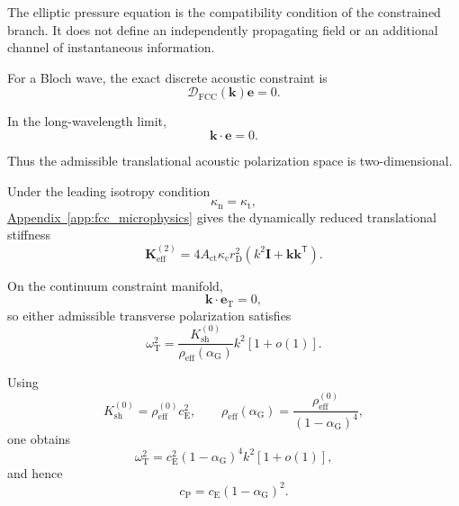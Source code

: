 The elliptic pressure equation is the compatibility condition of the constrained branch. It does not define an independently propagating field or an additional channel of instantaneous information.

For a Bloch wave, the exact discrete acoustic constraint is
\begin{equation}
    \mathcal{D}_{\mathrm{FCC}}(\mathbf{k})
    \mathbf{e}
    =
    0.
\end{equation}

In the long-wavelength limit,
\begin{equation}
    \mathbf{k}\cdot\mathbf{e}
    =
    0.
\end{equation}

Thus the admissible translational acoustic polarization space is two-dimensional.

Under the leading isotropy condition
\begin{equation}
    \kappa_{\mathrm{n}}
    =
    \kappa_{\mathrm{t}},
\end{equation}
\hyperref[app:fcc_microphysics]{Appendix~\ref*{app:fcc_microphysics}} gives the dynamically reduced translational stiffness
\begin{equation}
    \mathbf{K}_{\mathrm{eff}}^{(2)}
    =
    4A_{\mathrm{ct}}
    \kappa_{\mathrm{c}}
    r_{\mathrm{D}}^2
    \left(
        k^2\mathbf{I}
        +
        \mathbf{k}\mathbf{k}^{\mathsf{T}}
    \right).
\end{equation}

On the continuum constraint manifold,
\begin{equation}
    \mathbf{k}\cdot\mathbf{e}_{\mathrm{T}}
    =
    0,
\end{equation}
so either admissible transverse polarization satisfies
\begin{equation}
    \omega_{\mathrm{T}}^2
    =
    \frac{
        K_{\mathrm{sh}}^{(0)}
    }{
        \rho_{\mathrm{eff}}(\alpha_{\mathrm{G}})
    }
    k^2
    \left[
        1+o(1)
    \right].
\end{equation}

Using
\begin{equation}
    K_{\mathrm{sh}}^{(0)}
    =
    \rho_{\mathrm{eff}}^{(0)}
    c_{\mathrm{E}}^2,
    \qquad
    \rho_{\mathrm{eff}}(\alpha_{\mathrm{G}})
    =
    \frac{
        \rho_{\mathrm{eff}}^{(0)}
    }{
        (1-\alpha_{\mathrm{G}})^4
    },
\end{equation}
one obtains
\begin{equation}
    \omega_{\mathrm{T}}^2
    =
    c_{\mathrm{E}}^2
    (1-\alpha_{\mathrm{G}})^4
    k^2
    \left[
        1+o(1)
    \right],
\end{equation}
and hence
\begin{equation}
    c_{\mathrm{P}}
    =
    c_{\mathrm{E}}
    (1-\alpha_{\mathrm{G}})^2.
\end{equation}

